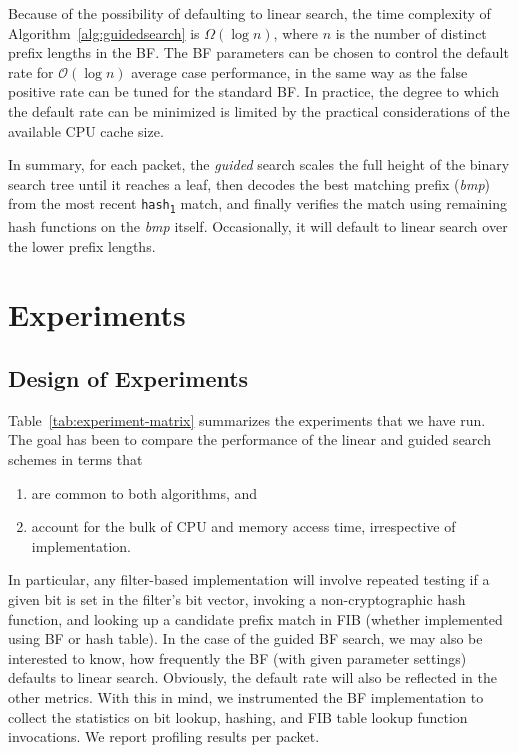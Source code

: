\documentclass[conference,compsoc]{IEEEtran}
\begin{document}
Because of the possibility of defaulting to linear search, the time
complexity of Algorithm~\ref{alg:guidedsearch} is $\Omega(\log n)$, 
where $n$ is the number of distinct prefix lengths in the BF.
The BF parameters can be chosen to control the default rate for
$\mathcal{O}(\log n)$ average case performance, in the same
way as the false positive rate can be tuned for the standard BF.
In practice, the degree to which the default rate can be minimized is
limited by the practical considerations of the available CPU cache size.

In summary, for each packet, the \emph{guided} search scales the full
height of the binary search tree until it reaches a leaf, then decodes
the best matching prefix (\emph{bmp}) from the most recent
\texttt{hash\textsubscript{1}} match, and finally verifies
the match using remaining hash functions on the \emph{bmp} itself.
Occasionally, it will default to linear search over the lower prefix 
lengths.

\section{Experiments}

\subsection{Design of Experiments}

Table~\ref{tab:experiment-matrix} summarizes the experiments that we have
run. The goal has been to compare the performance of the linear and guided 
search schemes in terms that

\begin{enumerate}[label=(\alph*)]
\item are common to both algorithms, and
\item account for the bulk of CPU and memory access time, irrespective of 
  implementation.
\end{enumerate}

In particular, any filter-based implementation will involve repeated testing
if a given bit is set in the filter's bit vector, invoking a
non-cryptographic hash function, and looking up a candidate prefix match in
FIB (whether implemented using BF or hash table). In the case
of the guided BF search, we may also be interested to know, how frequently
the BF (with given parameter settings) defaults to linear search. Obviously,
the default rate will also be reflected in the other metrics.
With this in mind, we instrumented the BF implementation to collect the
statistics on bit lookup, hashing, and FIB table lookup function
invocations. We report profiling results per packet.
\end{document}
